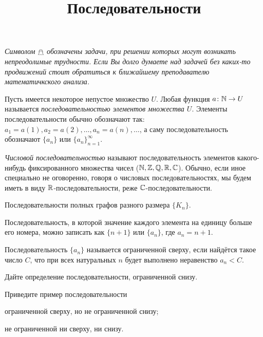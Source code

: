 \documentclass[a4paper, 12pt, num=24]{listok}
\begin{document}
\title{Последовательности}
\maketitle{}
\begin{center}
    \textit{Символом $\mathghost$ обозначены задачи, при решении которых могут возникать непреодолимые трудности.
    Если Вы долго думаете над задачей без каких-то продвижений стоит обратиться к ближайшему преподавателю математичкского анализа.}
\end{center}
\begin{definition}
    Пусть имеется некоторое непустое множество $U$.
    Любая функция $a \colon \mathbb{N} \to U$ называется \textit{последовательностью элементов множества $U$}.
    Элементы последовательности обычно обозначают так: $a_1 = a(1), a_2 = a(2), \ldots, a_n = a(n), \ldots$,
    а саму последовательность обозначают $\{a_n\}$ или ${\{a_n\}}_{n = 1}^{\infty}$.
\end{definition}
\begin{definition}
    \textit{Числовой последовательностью} называют последовательность элементов какого-нибудь фиксированного множества чисел ($\mathbb{N}, \mathbb{Z}, \mathbb{Q}, \mathbb{R}, \mathbb{C}$).
    Обычно, если иное специально не оговоренно, говоря о числовых последовательностях, мы будем иметь в виду $\mathbb{R}$-последовательности, реже $\mathbb{C}$-последовательности.
\end{definition}
\begin{example}
    Последовательности полных графов разного размера $\{K_n\}$.
\end{example}
\begin{example}
    Последовательность, в которой значение каждого элемента на единицу больше его номера,
    можно записать как $\{n + 1\}$ или $\{a_n\}$, где $a_n = n + 1$.
\end{example}
\begin{definition}
    Последовательность $\{a_n\}$ называется ограниченной сверху, если найдётся такое число $C$,
    что при всех натуральных $n$ будет выполнено неравенство $a_n < C$.
\end{definition}
\begin{problem}
    Дайте определение последовательности, ограниченной снизу.
\end{problem}
\begin{problem}
    Приведите пример последовательности
    \begin{probparts}
        \item ограниченной сверху, но не ограниченной снизу;
        \item не ограниченной ни сверху, ни снизу.
    \end{probparts}
\end{problem}
\end{document}
